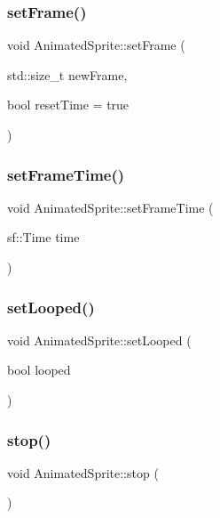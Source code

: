 \subsubsection{\texorpdfstring{set\+Frame()}{setFrame()}}
{\footnotesize\ttfamily void Animated\+Sprite\+::set\+Frame (\begin{DoxyParamCaption}\item[{std\+::size\+\_\+t}]{new\+Frame,  }\item[{bool}]{reset\+Time = {\ttfamily true} }\end{DoxyParamCaption})}

\hypertarget{class_animated_sprite_af598fab5c3599ccc5ed1e2d4fefa68cc}{}\label{class_animated_sprite_af598fab5c3599ccc5ed1e2d4fefa68cc} 
\subsubsection{\texorpdfstring{set\+Frame\+Time()}{setFrameTime()}}
{\footnotesize\ttfamily void Animated\+Sprite\+::set\+Frame\+Time (\begin{DoxyParamCaption}\item[{sf\+::\+Time}]{time }\end{DoxyParamCaption})}

\hypertarget{class_animated_sprite_a855a5a48ea2e1c51c7c9304857dd2f8c}{}\label{class_animated_sprite_a855a5a48ea2e1c51c7c9304857dd2f8c} 
\subsubsection{\texorpdfstring{set\+Looped()}{setLooped()}}
{\footnotesize\ttfamily void Animated\+Sprite\+::set\+Looped (\begin{DoxyParamCaption}\item[{bool}]{looped }\end{DoxyParamCaption})}

\hypertarget{class_animated_sprite_af9734f4346d3d2370322b2dcaeef133c}{}\label{class_animated_sprite_af9734f4346d3d2370322b2dcaeef133c} 
\subsubsection{\texorpdfstring{stop()}{stop()}}
{\footnotesize\ttfamily void Animated\+Sprite\+::stop (\begin{DoxyParamCaption}{ }\end{DoxyParamCaption})}

